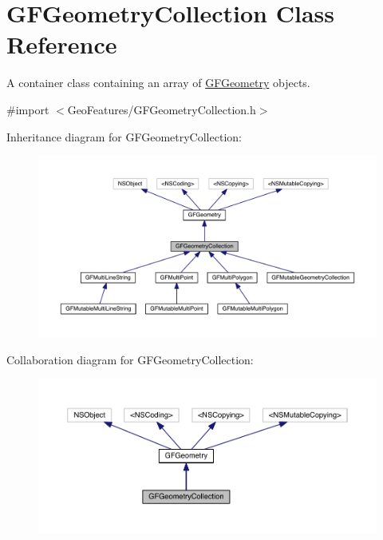 \hypertarget{interface_g_f_geometry_collection}{}\section{G\+F\+Geometry\+Collection Class Reference}
\label{interface_g_f_geometry_collection}


A container class containing an array of \hyperlink{interface_g_f_geometry}{G\+F\+Geometry} objects.  




{\ttfamily \#import $<$Geo\+Features/\+G\+F\+Geometry\+Collection.\+h$>$}



Inheritance diagram for G\+F\+Geometry\+Collection\+:\nopagebreak
\begin{figure}[H]
\begin{center}
\leavevmode
\includegraphics[width=350pt]{interface_g_f_geometry_collection__inherit__graph}
\end{center}
\end{figure}


Collaboration diagram for G\+F\+Geometry\+Collection\+:\nopagebreak
\begin{figure}[H]
\begin{center}
\leavevmode
\includegraphics[width=350pt]{interface_g_f_geometry_collection__coll__graph}
\end{center}
\end{figure}

